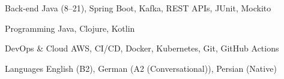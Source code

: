 

\begin{cvskills}

  \cvskill
    {Back-end}
    {Java (8–21), Spring Boot, Kafka, REST APIs, JUnit, Mockito}

  \cvskill
    {Programming} %
    {Java, Clojure, Kotlin} %

  \cvskill
    {DevOps \& Cloud} %
    {AWS, CI/CD, Docker, Kubernetes, Git, GitHub Actions } %
  
  \cvskill
    {Languages} %
    {English (B2), German (A2 (Conversational)), Persian (Native)} %

\end{cvskills}
